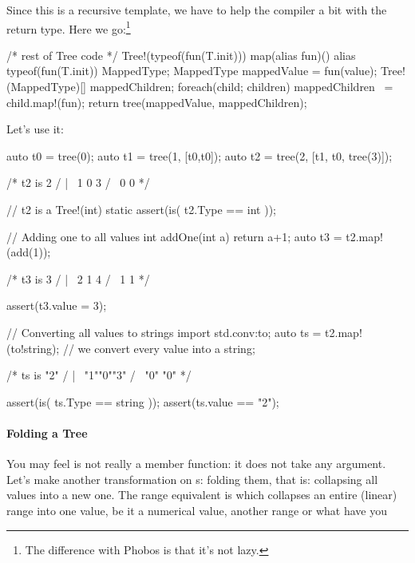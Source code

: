 Since this is a recursive template, we have to help the compiler a bit with the return type. Here we go:\footnote{ The difference with Phobos  is that it's not lazy.}

\begin{dcode}
/* rest of Tree code */
    Tree!(typeof(fun(T.init))) map(alias fun)()
    {
        alias typeof(fun(T.init)) MappedType;
        MappedType mappedValue = fun(value);
        Tree!(MappedType)[] mappedChildren;
        foreach(child; children) mappedChildren ~= child.map!(fun);
        return tree(mappedValue, mappedChildren);
    }
\end{dcode}

Let's use it:

\begin{dcode}
auto t0 = tree(0);
auto t1 = tree(1, [t0,t0]);
auto t2 = tree(2, [t1, t0, tree(3)]);

/* t2 is       2
             / | \
            1  0  3
           / \
          0   0
*/

// t2 is a Tree!(int)
static assert(is( t2.Type == int ));

// Adding one to all values
int addOne(int a) { return a+1;}
auto t3 = t2.map!(add(1));

/* t3 is       3
             / | \
            2  1  4
           / \
          1   1
*/

assert(t3.value = 3);

// Converting all values to strings
import std.conv:to;
auto ts = t2.map!(to!string); // we convert every value into a string;

/* ts is      "2"
             / | \
           "1""0""3"
           / \
         "0"  "0"
*/

assert(is( ts.Type == string ));
assert(ts.value == "2");
\end{dcode}

\paragraph{Folding a Tree} You may feel  is not really a member function: it does not take any argument. Let's make another transformation on s: folding them, that is: collapsing all values into a new one. The range equivalent is  which collapses an entire (linear) range into one value, be it a numerical value, another range or what have you

